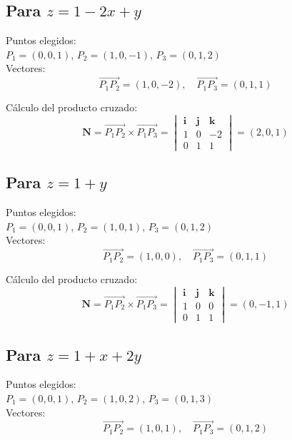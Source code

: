 \documentclass{article}
\begin{document}
\subsection{Para $z = 1 - 2x + y$}
Puntos elegidos: \\ 
$P_1 = (0,0,1)$, $P_2 = (1,0,-1)$, $P_3 = (0,1,2)$ \\  
Vectores:
\begin{equation*}
    \overrightarrow{P_1P_2} = (1,0,-2), \quad \overrightarrow{P_1P_3} = (0,1,1)
\end{equation*}

Cálculo del producto cruzado:
\begin{equation*}
    \mathbf{N} = \overrightarrow{P_1P_2} \times \overrightarrow{P_1P_3} =
    \begin{vmatrix} 
    \mathbf{i} & \mathbf{j} & \mathbf{k} \\
    1 & 0 & -2 \\
    0 & 1 & 1
    \end{vmatrix} = (2, 0, 1)
\end{equation*}

\subsection{Para $z = 1 + y$}
Puntos elegidos: \\ 
$P_1 = (0,0,1)$, $P_2 = (1,0,1)$, $P_3 = (0,1,2)$ \\  
Vectores:
\begin{equation*}
    \overrightarrow{P_1P_2} = (1,0,0), \quad \overrightarrow{P_1P_3} = (0,1,1)
\end{equation*}

Cálculo del producto cruzado:
\begin{equation*}
    \mathbf{N} = \overrightarrow{P_1P_2} \times \overrightarrow{P_1P_3} =
    \begin{vmatrix} 
    \mathbf{i} & \mathbf{j} & \mathbf{k} \\
    1 & 0 & 0 \\
    0 & 1 & 1
    \end{vmatrix} = (0, -1, 1)
\end{equation*}

\subsection{Para $z = 1 + x + 2y$}
Puntos elegidos: \\ 
$P_1 = (0,0,1)$, $P_2 = (1,0,2)$, $P_3 = (0,1,3)$ \\  
Vectores:
\begin{equation*}
    \overrightarrow{P_1P_2} = (1,0,1), \quad \overrightarrow{P_1P_3} = (0,1,2)
\end{equation*}
\end{document}
